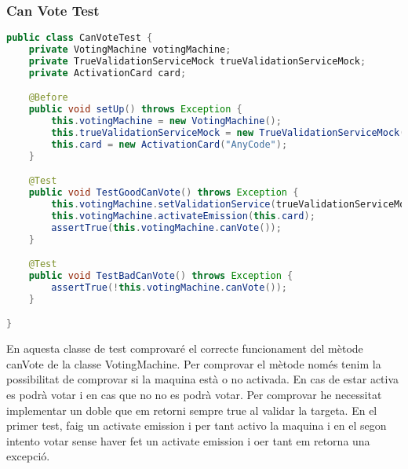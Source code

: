 \documentclass[11pt]{article}
\begin{document}
	\subsubsection{Can Vote Test}
	\begin{lstlisting}[basicstyle=\ttfamily\scriptsize,language=Java]
public class CanVoteTest {
    private VotingMachine votingMachine;
    private TrueValidationServiceMock trueValidationServiceMock;
    private ActivationCard card;

    @Before
    public void setUp() throws Exception {
        this.votingMachine = new VotingMachine();
        this.trueValidationServiceMock = new TrueValidationServiceMock();
        this.card = new ActivationCard("AnyCode");
    }

    @Test
    public void TestGoodCanVote() throws Exception {
        this.votingMachine.setValidationService(trueValidationServiceMock);
        this.votingMachine.activateEmission(this.card);
        assertTrue(this.votingMachine.canVote());
    }

    @Test
    public void TestBadCanVote() throws Exception {
        assertTrue(!this.votingMachine.canVote());
    }

}
	\end{lstlisting}
	En aquesta classe de test comprovaré el correcte funcionament del mètode canVote de la classe VotingMachine. Per comprovar el mètode només tenim la possibilitat de comprovar si la maquina està o no activada. En cas de estar activa es podrà votar i en cas que no no es podrà votar. Per comprovar he necessitat implementar un doble que em retorni sempre true al validar la targeta. En el primer test, faig un activate emission i per tant activo la maquina i en el segon intento votar sense haver fet un activate emission i oer tant em retorna una excepció.
	\\\\
\end{document}
